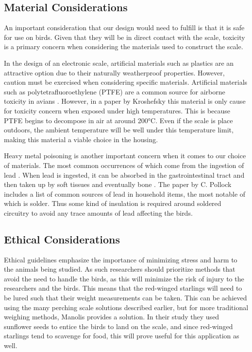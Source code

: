 \documentclass[class=report,11pt,crop=false]{standalone}
\begin{document}
\subsection{Material Considerations}
An important consideration that our design would need to fulfill is that it is safe for use on birds. Given that they will be in direct contact with the scale, toxicity is a primary concern when considering the materials used to construct the scale.

In the design of an electronic scale, artificial materials such as plastics are an attractive option due to their naturally weatherproof properties. However, caution must be exercised when considering specific materials. Artificial materials such as polytetrafluoroethylene (PTFE) are a common source for airborne toxicity in avians \cite{LightfootToxicity}. However, in a paper by Kroshefsky \cite{KroshefskyTeflon} this material is only cause for toxicity concern when exposed under high temperatures. This is because PTFE begins to decompose in air at around 200°C. Even if the scale is place outdoors, the ambient temperature will be well under this temperature limit, making this material a viable choice in the housing.

Heavy metal poisoning is another important concern when it comes to our choice of materials. The most common occurrences of which come from the ingestion of lead \cite{PollockHeavyMetal}. When lead is ingested, it can be absorbed in the gastrointestinal tract and then taken up by soft tissues and eventually bone \cite{PollockHeavyMetal}. The paper by C. Pollock includes a list of common sources of lead in household items, the most notable of which is solder. Thus some kind of insulation is required around soldered circuitry to avoid any trace amounts of lead affecting the birds.

\subsection{Ethical Considerations}
Ethical guidelines emphasize the importance of minimizing stress and harm to the animals being studied. As such researchers should prioritize methods that avoid the need to handle the birds, as this will minimize the risk of injury to the researchers and the birds. This means that the red-winged starlings will need to be lured such that their weight measurements can be taken. This can be achieved using the many perching scale solutions described earlier, but for more traditional weighing methods, Manolis \cite{reid1999measurement} provides a solution. In their study they used sunflower seeds to entice the birds to land on the scale, and since red-winged starlings tend to scavenge for food, this will prove useful for this application as well. 
\end{document}
